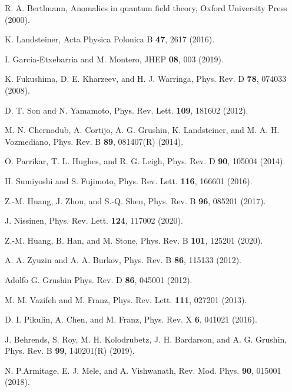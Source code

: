 \documentclass[twocolumn,prl,10pt,superscriptaddress]{revtex4}
\begin{document}
\begin{thebibliography}{99}

R. A. Bertlmann, Anomalies in quantum field theory, Oxford University Press (2000).

K. Landsteiner,
Acta Physica Polonica B \textbf{47}, 2617 (2016).


 I. Garcia-Etxebarria and M. Montero, JHEP \textbf{08}, 003 (2019).


K. Fukushima, D. E. Kharzeev, and H. J. Warringa,
Phys. Rev. D \textbf{78}, 074033 (2008).


D. T. Son and N. Yamamoto,
Phys. Rev. Lett. \textbf{109}, 181602 (2012).

M. N. Chernodub, A. Cortijo, A. G. Grushin, K. Landsteiner, and M. A. H. Vozmediano,
Phys. Rev. B \textbf{89}, 081407(R) (2014).

O. Parrikar, T. L. Hughes, and R. G. Leigh,
Phys. Rev. D \textbf{90}, 105004 (2014).

H. Sumiyoshi and S. Fujimoto,
Phys. Rev. Lett. \textbf{116}, 166601 (2016).

Z.-M. Huang, J. Zhou, and S.-Q. Shen,
Phys. Rev. B \textbf{96}, 085201 (2017).

J. Nissinen,
Phys. Rev. Lett. \textbf{124}, 117002 (2020).

Z.-M. Huang, B. Han, and M. Stone,
Phys. Rev. B \textbf{101}, 125201 (2020).


A. A. Zyuzin and A. A. Burkov,
Phys. Rev. B \textbf{86}, 115133 (2012).

Adolfo G. Grushin
Phys. Rev. D \textbf{86}, 045001 (2012).

M. M. Vazifeh and M. Franz,
Phys. Rev. Lett. \textbf{111}, 027201 (2013).

D. I. Pikulin, A. Chen, and M. Franz,
Phys. Rev. X \textbf{6}, 041021 (2016).

J. Behrends, S. Roy, M. H. Kolodrubetz, J. H. Bardarson, and A. G. Grushin,
Phys. Rev. B \textbf{99}, 140201(R) (2019).

N. P.Armitage, E. J. Mele, and A. Vishwanath,
Rev. Mod. Phys. \textbf{90}, 015001 (2018).


\end{thebibliography}
\end{document}
